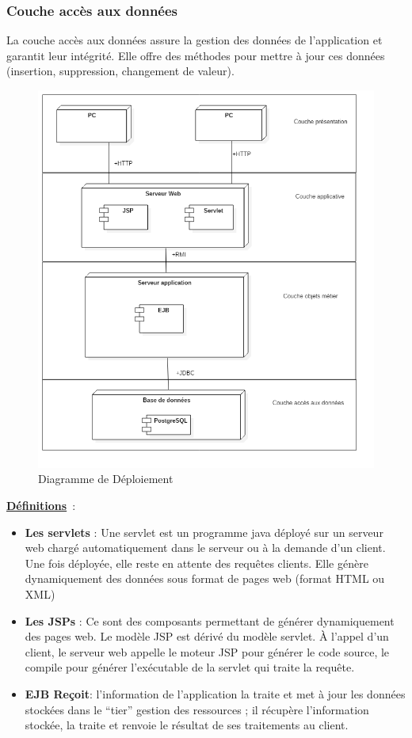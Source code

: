 \documentclass[a4paper, titlepage]{report}
\let\oldparagraph\subsubsection
\renewcommand{\subsubsection}[1]{\oldparagraph{#1}\mbox{}}
\begin{document}
\subsubsection{Couche accès aux données}

La couche accès aux données assure la gestion des données de
l'application et garantit leur intégrité. Elle offre des méthodes pour
mettre à jour ces données (insertion, suppression, changement de
valeur).

\clearpage
\begin{figure}[!hp]
\centering
\includegraphics{Images/Architecture.png}
\caption{Diagramme de Déploiement}
\end{figure}

\textbf{\underline{Définitions}}~: 
\begin{itemize}
\item \textbf{Les servlets} : Une servlet est un programme java déployé
sur un serveur web chargé automatiquement dans le serveur ou à la
demande d'un client. Une fois déployée, elle reste en attente des
requêtes clients. Elle génère dynamiquement des données sous format de
pages web (format HTML ou XML)
\item \textbf{Les JSPs} : Ce sont des composants permettant de générer dynamiquement des pages web. Le modèle JSP est dérivé du modèle servlet. À l'appel d'un client, le serveur web appelle le moteur JSP pour générer le code source, le compile pour générer l'exécutable de la servlet qui traite la requête.
\item \textbf{EJB Reçoit}: l'information de l'application la traite et met à jour les données stockées dans le ``tier'' gestion des ressources ; il récupère l'information stockée, la traite et renvoie le résultat de ses
traitements au client.
\end{itemize}
\end{document}

